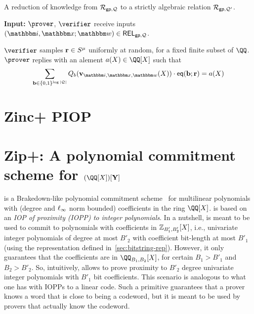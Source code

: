 \documentclass[11pt,letterpaper,usenames,dvipsnames]{article}
\begin{document}
     	\begin{algorithm}[H]
		\caption{A 
        reduction of knowledge from $\mathcal{R}_{\mathsf{gp}, \mathcal{Q}}$ to a strictly algebraic relation $\mathcal{R}_{\mathsf{gp}, \mathcal{Q}'}$. \label{a: red_to_strictly_algebraic}}
		\textbf{Input:} $\Prover$, $\verifier$ receive inputs $(\idx, \inp; \wit)\in \REL_{\gp, \cQ}$. %
		\begin{algorithmic}[1]
            \STATE $\verifier$ samples $\mathbf{r}\in S^\mu$ uniformly at random, for a fixed finite subset of $\QQ$. 
            \STATE $\prover$ replies with an alement $a(X)\in \QQ[X]$ such that
            $$
            \sum_{\bb\in \{0,1\}^{\log|\cQ|}} Q_b(\vv_{\idx,\inp,\wit}(X))\cdot \eq(\bb; \rr) = a(X)
            $$
            \STATE 
		\end{algorithmic}
	\end{algorithm}



\section{Zinc+ PIOP}





\section{Zip+: A polynomial commitment scheme for $(\QQ[X])[\vec Y]$}
\label{sec:zip+}

\zipp is a Brakedown-like polynomial commitment scheme~\cite{C:GLSTW23} for multilinear polynomials with (degree and $\ell_\infty$ norm bounded) coefficients in the ring $\QQ[X]$. \zipp is based on an \emph{IOP of proximity (IOPP) to integer polynomials}. In a nutshell, \zipp is meant to be used to commit to polynomials with coefficients in $\mathbb{Z}_{B'_1,B'_2}[X]$, i.e., univariate integer polynomials of degree at most $B'_2$ with coefficient bit-length at most $B'_1$ (using the representation defined in~\cref{sec:bitstring-rep}). However, it only guarantees that the coefficients are in $\QQ_{B_1,B_2}[X]$, for certain $B_1>B'_1$ and $B_2>B'_2$. So, intuitively, \zipp allows to prove proximity to $B'_2$ degree univariate integer polynomials with $B'_1$ bit coefficients. This scenario is analogous to what one has with IOPPs to a linear code. Such a primitive guarantees that a prover knows a word that is close to being a codeword, but it is meant to be used by provers that actually know the codeword.
\end{document}
